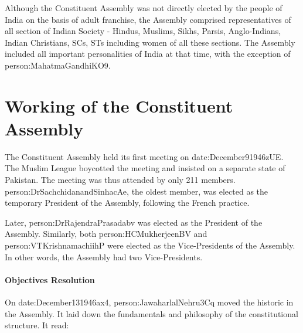 Although the Constituent Assembly was not directly elected by the people of India on the basis of adult franchise, the Assembly comprised representatives of all section of Indian Society - Hindus, Muslims, Sikhs, Parsis, Anglo-Indians, Indian Christians, SCs, STs including women of all these sections. The Assembly included all important personalities of India at that time, with the exception of \gls{person:MahatmaGandhiKO9}.

\section{Working of the Constituent Assembly}

The Constituent Assembly held its first meeting on \gls{date:December91946zUE}. The Muslim League boycotted the meeting and insisted on a separate state of Pakistan. The meeting was thus attended by only 211 members. {\gls{person:DrSachchidanandSinhacAe}, the oldest member, was elected as the temporary President of the Assembly, following the French practice.}

Later, \gls{person:DrRajendraPrasadabv} was elected as the President of the Assembly. Similarly, both \gls{person:HCMukherjeenBV} and \gls{person:VTKrishnamachiihP} were elected as the Vice-Presidents of the Assembly. In other words, the Assembly had two Vice-Presidents.

\paragraph{Objectives Resolution}

On \gls{date:December131946ax4}, \gls{person:JawaharlalNehru3Cq} moved the historic  in the Assembly. It laid down the fundamentals and philosophy of the constitutional structure. It read:

